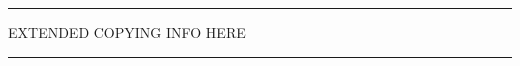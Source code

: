 
{\centering\rule{\textwidth}{.5\baselineskip}\par}
\vspace{.5\baselineskip}
{\large\centering
EXTENDED COPYING INFO HERE\par}
\vspace{.5\baselineskip}
{\centering\rule{\textwidth}{.5\baselineskip}\par}
\vfill
